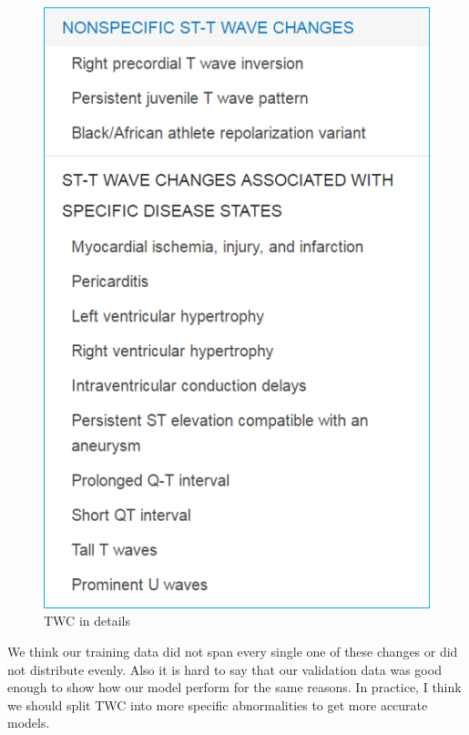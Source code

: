 \documentclass[runningheads]{llncs}
\begin{document}
\begin{figure}[H]
	\includegraphics[width=\linewidth]{img/twc2.png}
	\caption{\label{fig:twc2} TWC in details \cite{UptoDate}}
\end{figure}
We think our training data did not span every single one of these changes or did not distribute evenly. Also it is hard to say that our validation data was good enough to show how our model perform for the same reasons. In practice, I think we should split TWC into more specific abnormalities to get more accurate models.

\end{document}
